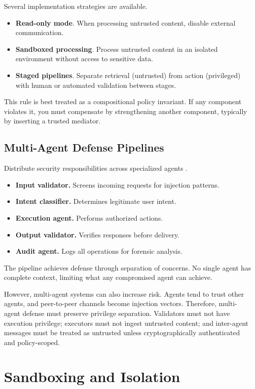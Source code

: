 Several implementation strategies are available.
\begin{itemize}
\item \textbf{Read-only mode}. When processing untrusted content, disable external communication.
\item \textbf{Sandboxed processing}. Process untrusted content in an isolated environment without access to sensitive data.
\item \textbf{Staged pipelines}. Separate retrieval (untrusted) from action (privileged) with human or automated validation between stages.
\end{itemize}

This rule is best treated as a compositional policy invariant. If any component violates it, you must compensate by strengthening another component, typically by inserting a trusted mediator.

\subsection{Multi-Agent Defense Pipelines}

Distribute security responsibilities across specialized agents \cite{multiagentdefense2025}.
\begin{itemize}
\item \textbf{Input validator.} Screens incoming requests for injection patterns.
\item \textbf{Intent classifier.} Determines legitimate user intent.
\item \textbf{Execution agent.} Performs authorized actions.
\item \textbf{Output validator.} Verifies responses before delivery.
\item \textbf{Audit agent.} Logs all operations for forensic analysis.
\end{itemize}

The pipeline achieves defense through separation of concerns. No single agent has complete context, limiting what any compromised agent can achieve.

However, multi-agent systems can also increase risk. Agents tend to trust other agents, and peer-to-peer channels become injection vectors. Therefore, multi-agent defense must preserve privilege separation. Validators must not have execution privilege; executors must not ingest untrusted content; and inter-agent messages must be treated as untrusted unless cryptographically authenticated and policy-scoped.

\section{Sandboxing and Isolation}

